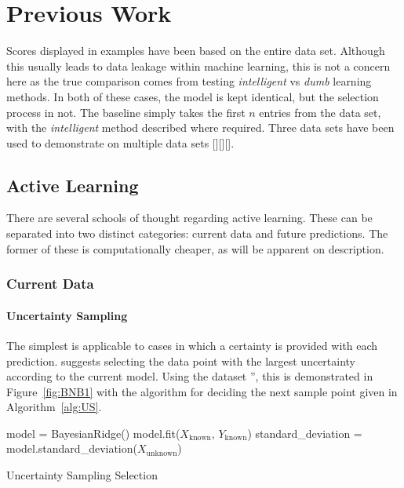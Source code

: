 
\chapter{Previous Work}


\graphicspath{{Chapter2/Figs/Vector/}{Chapter2/Figs/}}


Scores displayed in examples have been based on the entire data set. Although this usually leads to data leakage within machine learning, this is not a concern here as the true comparison comes from testing  \textit{intelligent} vs \textit{dumb} learning methods. In both of these cases, the model is kept identical, but the selection process in not. The baseline simply takes the first $n$ entries from the data set, with the \textit{intelligent} method described where required. Three data sets have been used to demonstrate on multiple data sets [][][].

\section{Active Learning}\label{ch:Active Learning}
There are several schools of thought regarding active learning. These can be separated into two distinct categories: current data and future predictions. The former of these is computationally cheaper, as will be apparent on description.

\subsection{Current Data}
\subsubsection{Uncertainty Sampling}\label{sec:Uncertainty Sampling}
The simplest is applicable to cases in which a certainty is provided with each prediction. \textcite{Set09} suggests selecting the data point with the largest uncertainty according to the current model. Using the dataset '', this is demonstrated in Figure~\ref{fig:BNB1} with the algorithm for deciding the next sample point given in Algorithm~\ref{alg:US}.
\\
\begin{algorithm}[H]
  model = BayesianRidge()\;
  model.fit($X_\mathrm{known}$, $Y_\mathrm{known}$)\;
  standard\_deviation = model.standard\_deviation($X_\mathrm{unknown}$)\;
  \caption{Uncertainty Sampling Selection}
  \label{alg:US}\SetAlgoLined
\end{algorithm}


